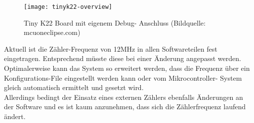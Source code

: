 \begin{figure}[H]
	\centering
	\texttt{[image: tinyk22-overview]}
	\caption{Tiny K22 Board mit eigenem Debug- Anschluss (Bildquelle: mcuoneclipse.com)}
	\label{fig:tinyk22-overview}
\end{figure}
Aktuell ist die Zähler-Frequenz von 12MHz in allen Softwareteilen fest eingetragen. Entsprechend müsste diese bei einer Änderung angepasst werden. Optimalerweise kann das System so erweitert werden, dass die Frequenz über ein Konfigurations-File eingestellt werden kann oder vom Mikrocontroller- System gleich automatisch ermittelt und gesetzt wird.\\
Allerdings bedingt der Einsatz eines externen Zählers ebenfalls Änderungen an der Software und es ist kaum anzunehmen, dass sich die Zählerfrequenz laufend ändert.